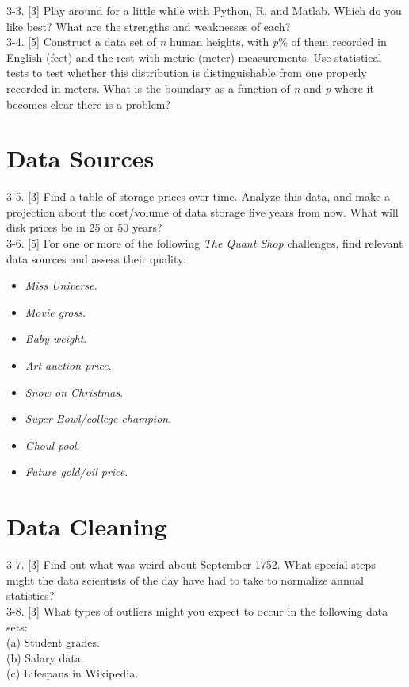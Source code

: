 \documentclass[10pt]{article}
\begin{document}
3-3. [3] Play around for a little while with Python, R, and Matlab. Which do you like best? What are the strengths and weaknesses of each?\\
3-4. [5] Construct a data set of \textit{n} human heights, with \textit{p}\% of them recorded in English (feet) and the rest with metric (meter) measurements. Use statistical tests to test whether this distribution is distinguishable from one properly recorded in meters. What is the boundary as a function of \textit{n} and \textit{p} where it becomes clear there is a problem?

\section*{Data Sources}
3-5. [3] Find a table of storage prices over time. Analyze this data, and make a projection about the cost/volume of data storage five years from now. What will disk prices be in 25 or 50 years?\\
3-6. [5] For one or more of the following \textit{The Quant Shop} challenges, find relevant data sources and assess their quality:
\begin{itemize}
  \item \textit{Miss Universe}.
  \item \textit{Movie gross}.
  \item \textit{Baby weight}.
  \item \textit{Art auction price}.
  \item \textit{Snow on Christmas}.
  \item \textit{Super Bowl/college champion}.
  \item \textit{Ghoul pool}.
  \item \textit{Future gold/oil price}.
\end{itemize}

\section*{Data Cleaning}
3-7. [3] Find out what was weird about September 1752. What special steps might the data scientists of the day have had to take to normalize annual statistics?\\
3-8. [3] What types of outliers might you expect to occur in the following data sets:\\
(a) Student grades.\\
(b) Salary data.\\
(c) Lifespans in Wikipedia.
\end{document}

